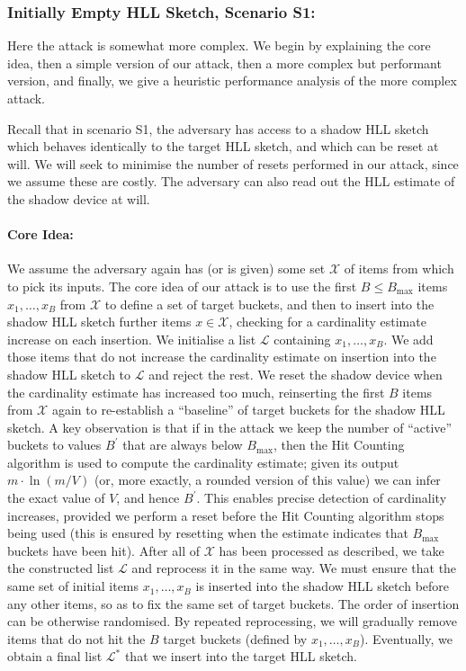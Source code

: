 \documentclass[sigconf, anonymous, dvipsnames]{acmart} %
\begin{document}
\subsubsection{Initially Empty HLL Sketch, Scenario S1:} 

Here the attack is somewhat more complex. We begin by explaining the core idea, then a simple version of our attack, then a more complex but performant version, and finally, we give a heuristic performance analysis of the more complex attack.

Recall that in scenario S1, the adversary has access to a shadow HLL sketch which behaves identically to the target HLL sketch, and which can be reset at will. We will seek to minimise the number of resets performed in our attack, since we assume these are costly.  The adversary can also read out the HLL estimate of the shadow device at will. 

\paragraph{Core Idea:}
We assume the adversary again has (or is given) some set ${\mathcal{X}}$ of items from which to pick its inputs. The core idea of our attack is to use the first $B \leq B_{\max}$ items $x_1,\ldots, x_B$ from ${\mathcal{X}}$ to define a set of target buckets, and then to insert into the shadow HLL sketch further items $x \in {\mathcal{X}}$, checking for a cardinality estimate increase on each insertion. We initialise a list ${\mathcal{L}}$ containing $x_1,\ldots, x_B$. We add those items that do not increase the cardinality estimate on insertion into the shadow HLL sketch to ${\mathcal{L}}$ and reject the rest. We reset the shadow device when the cardinality estimate has increased too much, reinserting the first $B$ items from ${\mathcal{X}}$ again to re-establish a ``baseline'' of target buckets for the shadow HLL sketch. A key observation is that if in the attack we keep the number of ``active'' buckets to values $B^\prime$ that are always below $B_{\max}$, then the Hit Counting algorithm is used to compute the cardinality estimate; given its output $m \cdot \ln (m/V)$ (or, more exactly, a rounded version of this value) we can infer the exact value of $V$, and hence $B^\prime$. This enables precise detection of cardinality increases, provided we perform a reset before the Hit Counting algorithm stops being used (this is ensured by resetting when the estimate indicates that $B_{\max}$ buckets have been hit). After all of ${\mathcal{X}}$ has been processed as described, we take the constructed list ${\mathcal{L}}$ and reprocess it in the same way. We must ensure that the same set of initial items $x_1,\ldots, x_B$ is inserted into the shadow HLL sketch before any other items, so as to fix the same set of target buckets. The order of insertion can be otherwise randomised. %
By repeated reprocessing, we will gradually remove items that do not hit the $B$ target buckets (defined by $x_1,\ldots, x_B$). Eventually, we obtain a final list ${\mathcal{L}}^*$ that we insert into the target HLL sketch. 
\end{document}
